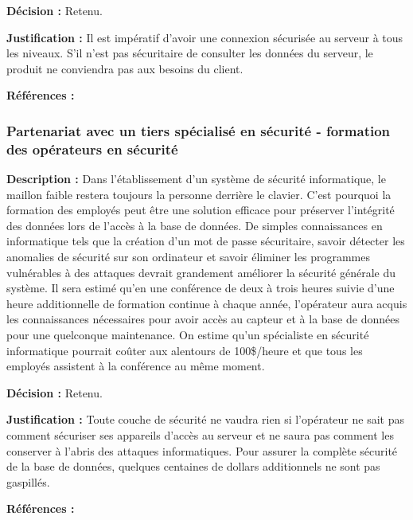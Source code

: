 \textbf{Décision :}  Retenu.

\textbf{Justification :}  Il est impératif d’avoir une connexion sécurisée au serveur à tous les niveaux. S’il n’est pas sécuritaire de consulter les données du serveur, le produit ne conviendra pas aux besoins du client.

\textbf{Références :} \cite{webopedia}

\subsubsection{Partenariat avec un tiers spécialisé en sécurité - formation des opérateurs en sécurité}

\textbf{Description :} Dans l’établissement d’un système de sécurité informatique, le maillon faible restera toujours la personne derrière le clavier. C’est pourquoi la formation des employés peut être une solution efficace pour préserver l’intégrité des données lors de l’accès à la base de données. De simples connaissances en informatique tels que la création d’un mot de passe sécuritaire, savoir détecter les anomalies de sécurité sur son ordinateur et savoir éliminer les programmes vulnérables à des attaques devrait grandement améliorer la sécurité générale du système. Il sera estimé qu’en une conférence de deux à trois heures suivie d’une heure additionnelle de formation continue à chaque année, l’opérateur aura acquis les connaissances nécessaires pour avoir accès au capteur et à la base de données pour une quelconque maintenance. On estime qu’un spécialiste en sécurité informatique pourrait coûter aux alentours de 100\$/heure et que tous les employés assistent à la conférence au même moment. 

\textbf{Décision :}  Retenu.

\textbf{Justification :}  Toute couche de sécurité ne vaudra rien si l’opérateur ne sait pas comment sécuriser ses appareils d’accès au serveur et ne saura pas comment les conserver à l’abris des attaques informatiques. Pour assurer la complète sécurité de la base de données, quelques centaines de dollars additionnels ne sont pas gaspillés.

\textbf{Références :} \cite{itspecialist}
\cite{itspecialist}

